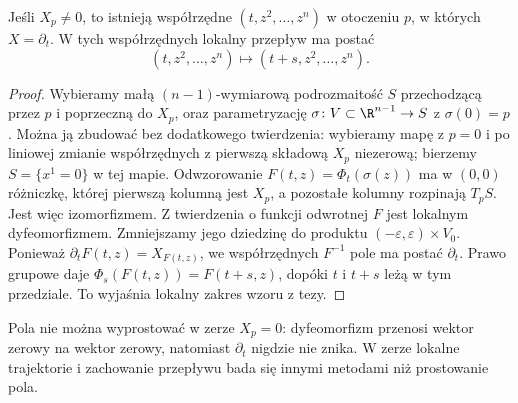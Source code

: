 \begin{twierdzenie}\label{thm:flowbox}
Jeśli $X_p\ne0$, to istnieją współrzędne $(t,z^2,\ldots,z^n)$
w otoczeniu $p$, w których $X=\partial_t$. W tych współrzędnych
lokalny przepływ ma postać
\[
 (t,z^2,\ldots,z^n)\longmapsto(t+s,z^2,\ldots,z^n).
\]
\end{twierdzenie}
\begin{proof}
Wybieramy małą $(n-1)$-wymiarową podrozmaitość $S$
przechodzącą przez $p$ i poprzeczną do $X_p$, oraz parametryzację
$\sigma\colon V\subset\R^{n-1}\to S$ z $\sigma(0)=p$.
Można ją zbudować bez dodatkowego twierdzenia: wybieramy mapę
z $p=0$ i po liniowej zmianie współrzędnych z pierwszą składową
$X_p$ niezerową; bierzemy $S=\{x^1=0\}$ w tej mapie.
Odwzorowanie $F(t,z)=\Phi_t(\sigma(z))$ ma w $(0,0)$
różniczkę, której pierwszą kolumną jest $X_p$, a pozostałe kolumny
rozpinają $T_pS$. Jest więc izomorfizmem. Z twierdzenia o funkcji
odwrotnej $F$ jest lokalnym dyfeomorfizmem. Zmniejszamy jego
dziedzinę do produktu $(-\varepsilon,\varepsilon)\times V_0$.
Ponieważ $\partial_tF(t,z)=X_{F(t,z)}$, we współrzędnych $F^{-1}$
pole ma postać $\partial_t$. Prawo grupowe daje
$\Phi_s(F(t,z))=F(t+s,z)$, dopóki $t$ i $t+s$ leżą
w tym przedziale. To wyjaśnia lokalny zakres wzoru z tezy.
\end{proof}

\begin{uwaga}
Pola nie można wyprostować w zerze $X_p=0$: dyfeomorfizm przenosi
wektor zerowy na wektor zerowy, natomiast $\partial_t$ nigdzie
nie znika. W zerze lokalne trajektorie i zachowanie przepływu
bada się innymi metodami niż prostowanie pola.
\end{uwaga}

